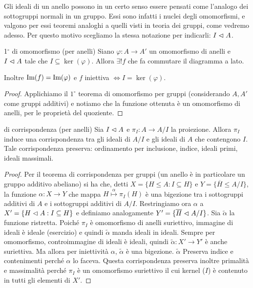 Gli ideali di un anello possono in un certo senso essere pensati come l'analogo dei sottogruppi normali in un gruppo. Essi sono infatti i nuclei degli omomorfismi, e valgono per essi teoremi analoghi a quelli visti in teoria dei gruppi, come vedremo adesso. Per questo motivo scegliamo la stessa notazione per indicarli: $I \vartriangleleft A$.

\vspace{0.5cm}

\begin{minipage}{0.7\textwidth}
\begin{theorem}{1$^{\circ}$ di omomorfismo (per anelli)}
    Siano $\varphi : A \rightarrow A'$ un omomorfismo di anelli e $I \vartriangleleft A$ tale che $I \subseteq \ker(\varphi)$. Allora $\exists ! f$ che fa commutare il diagramma a lato.
    
    Inoltre $\text{Im}(f) = \text{Im}(\varphi)$ e $f$ iniettiva $\iff I = \ker(\varphi)$.
\end{theorem}
\end{minipage}
\hfill
\begin{minipage}{0.2\textwidth}  
\end{minipage}
\begin{proof}
    Applichiamo il $1^{\circ}$ teorema di omomorfismo per gruppi (considerando $A, A'$ come gruppi additivi) e notiamo che la funzione ottenuta è un omomorfismo di anelli, per le proprietà del quoziente.
\end{proof}
\begin{theorem}{di corrispondenza (per anelli)}
    Sia $I \vartriangleleft A$ e $\pi_I: A \rightarrow A/I$ la proiezione. Allora $\pi_I$ induce una corrispondenza tra gli ideali di $A/I$ e gli ideali di $A$ che contengono $I$. Tale corrispondenza preserva: ordinamento per inclusione, indice, ideali primi, ideali massimali. 
\end{theorem}\begin{proof}
    Per il teorema di corrispondenza per gruppi (un anello è in particolare un gruppo additivo abeliano) si ha che, detti $X = \{ H \leq A : I \subseteq H\}$ e $Y = \{ \overline{H} \leq A/I\}$, la funzione $\alpha: X \rightarrow Y$ che mappa $H \overset{\alpha}{\mapsto} \pi_I(H)$ è una bigezione tra i sottogruppi additivi di $A$ e i sottogruppi additivi di $A/I$. Restringiamo ora $\alpha$ a $X' = \{ H \vartriangleleft A : I \subseteq H\}$ e definiamo analogamente $Y' = \{ \overline{H} \vartriangleleft A/I \}$. Sia $\tilde \alpha$ la funzione ristretta. Poiché $\pi_I$ è omomorfismo di anelli suriettivo, immagine di ideali è ideale (esercizio) e quindi $\tilde \alpha$ manda ideali in ideali. Sempre per omomorfismo, controimmagine di ideali è ideali, quindi $\tilde \alpha : X' \rightarrow Y'$ è anche suriettiva. Ma allora per iniettività $\alpha$, $\tilde \alpha$ è una bigezione. $\tilde \alpha$ Preserva indice e contenimenti perché $\alpha$ lo faceva. Questa corrispondenza preserva inoltre primalità e massimalità perché $\pi_I$ è un omomorfismo suriettivo il cui kernel ($I$) è contenuto in tutti gli elementi di $X'$.
\end{proof}

